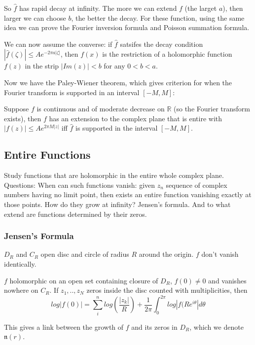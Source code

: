 \documentclass[main.tex]{subfiles}
\begin{document}
So $\hat{f}$ has rapid decay at infinity. The more we can extend $f$ (the larget $a$), then larger we can choose $b$, the better the decay. For these function, using the same idea we can prove the Fourier inversion formula and Poisson summation formula.

We can now assume the converse: if $\hat{f}$ satsifes the decay condition $|\hat{f}(\zeta)| \leq A e^{-2\pi a |\zeta|}$, then $f(x)$ is the restriction of a holomorphic function $f(z)$ in the strip $|Im(z)| < b$ for any $0 < b < a$.

Now we have the Paley-Wiener theorem, which gives criterion for when the Fourier transform is supported in an interval $[-M, M]$:
\begin{theorem}
Suppose $f$ is continuous and of moderate decrease on $\mathbb{R}$ (so the Fourier transform exists), then $f$ has an extension to the complex plane that is entire with $|f(z)| \leq Ae^{2 \pi M |z|}$ iff $\hat{f}$ is supported in the interval $[-M, M]$.
\end{theorem}

\subsection{Entire Functions}
Study functions that are holomorphic in the entire whole complex plane.
Questions: When can such functions vanish: given $z_n$ sequence of complex numbers having no limit point, then exists an entire function vanishing exactly at those points. How do they grow at infinity? Jensen's formula. And to what extend are functions determined by their zeros.

\subsubsection{Jensen's Formula}
$D_R$ and $C_R$ open disc and circle of radius $R$ around the origin. $f$ don't vanish identically.

\begin{theorem}
$f$ holomorphic on an open set containing closure of $D_R$, $f(0) \neq 0$ and vanishes nowhere on $C_R$. If $z_1, .. , z_N$ zeros inside the disc counted with multiplicities, then
$$
log |f(0)| = \sum_i ^n log(\frac{|z_k|}{R}) + \frac{1}{2\pi} \int_0 ^{2\pi} log |f (R e^{i\theta} | d\theta
$$
\end{theorem}

This gives a link between the growth of $f$ and its zeros in $D_R$, which we denote $\mathfrak{n}(r)$.
\end{document}
